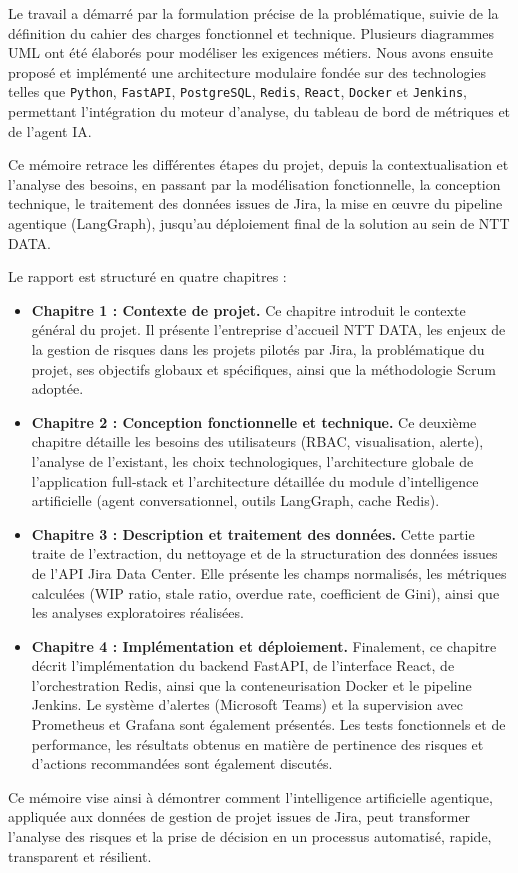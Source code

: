 \vspace{0.5em}

Le travail a démarré par la formulation précise de la problématique, suivie de la définition du cahier des charges fonctionnel et technique. Plusieurs diagrammes UML ont été élaborés pour modéliser les exigences métiers. Nous avons ensuite proposé et implémenté une architecture modulaire fondée sur des technologies telles que \texttt{Python}, \texttt{FastAPI}, \texttt{PostgreSQL}, \texttt{Redis}, \texttt{React}, \texttt{Docker} et \texttt{Jenkins}, permettant l’intégration du moteur d’analyse, du tableau de bord de métriques et de l’agent IA.

\vspace{0.5em}

Ce mémoire retrace les différentes étapes du projet, depuis la contextualisation et l’analyse des besoins, en passant par la modélisation fonctionnelle, la conception technique, le traitement des données issues de Jira, la mise en œuvre du pipeline agentique (LangGraph), jusqu’au déploiement final de la solution au sein de NTT DATA.

\vspace{1em}

Le rapport est structuré en quatre chapitres :

\begin{itemize}
	 \renewcommand{\labelitemi}{—}
	\item \textbf{Chapitre 1 : Contexte de projet.} Ce chapitre introduit le contexte général du projet. Il présente l’entreprise d’accueil NTT DATA, les enjeux de la gestion de risques dans les projets pilotés par Jira, la problématique du projet, ses objectifs globaux et spécifiques, ainsi que la méthodologie Scrum adoptée.
	
	\item \textbf{Chapitre 2 : Conception fonctionnelle et technique.} Ce deuxième chapitre détaille les besoins des utilisateurs (RBAC, visualisation, alerte), l’analyse de l’existant, les choix technologiques, l’architecture globale de l’application full‑stack et l’architecture détaillée du module d’intelligence artificielle (agent conversationnel, outils LangGraph, cache Redis).
	
	\item \textbf{Chapitre 3 : Description et traitement des données.} Cette partie traite de l’extraction, du nettoyage et de la structuration des données issues de l’API Jira Data Center. Elle présente les champs normalisés, les métriques calculées (WIP ratio, stale ratio, overdue rate, coefficient de Gini), ainsi que les analyses exploratoires réalisées.
	
	\item \textbf{Chapitre 4 : Implémentation et déploiement.} Finalement, ce chapitre décrit l’implémentation du backend FastAPI, de l’interface React, de l’orchestration Redis, ainsi que la conteneurisation Docker et le pipeline Jenkins. Le système d’alertes (Microsoft Teams) et la supervision avec Prometheus et Grafana sont également présentés. Les tests fonctionnels et de performance, les résultats obtenus en matière de pertinence des risques et d’actions recommandées sont également discutés.
\end{itemize}

Ce mémoire vise ainsi à démontrer comment l’intelligence artificielle agentique, appliquée aux données de gestion de projet issues de Jira, peut transformer l’analyse des risques et la prise de décision en un processus automatisé, rapide, transparent et résilient.